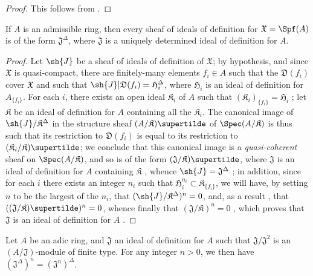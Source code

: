 \begin{proof}
This follows from .
\end{proof}

\begin{proposition}[10.3.5]
\label{I.10.3.5}
If $A$ is an admissible ring, then every sheaf of ideals of definition for $\mathfrak{X}=\Spf(A)$ is of the form $\mathfrak{J}^\Delta$, where $\mathfrak{J}$ is a uniquely determined ideal of definition for $A$.
\end{proposition}

\begin{proof}
Let $\sh{J}$ be a sheaf of ideals of definition of $\mathfrak{X}$; by hypothesis, and since $\mathfrak{X}$ is quasi-compact, there are finitely-many elements $f_i\in A$ such that the $\mathfrak{D}(f_i)$ cover $\mathfrak{X}$ and such that $\sh{J}|\mathfrak{D}(f_i)=\mathfrak{H}_i^\Delta$, where $\mathfrak{H}_i$ is an ideal of definition for $A_{\{f_i\}}$.
For each $i$, there exists an open ideal $\mathfrak{K}_i$ of $A$ such that $(\mathfrak{K}_i)_{\{f_i\}}=\mathfrak{H}_i$ ; let $\mathfrak{K}$ be an ideal of definition for $A$ containing all the $\mathfrak{K}_i$.
The canonical image of $\sh{J}/\mathfrak{K}^\Delta$ in the structure sheaf $(A/\mathfrak{K})\supertilde$ of $\Spec(A/\mathfrak{K})$  is thus such that its restriction to $\mathfrak{D}(f_i)$ is equal to its restriction to $(\mathfrak{K}_i/\mathfrak{K})\supertilde$;
we conclude that this canonical image is a \emph{quasi-coherent} sheaf on $\Spec(A/\mathfrak{K})$, and so is of the form $(\mathfrak{J}/\mathfrak{K})\supertilde$, where $\mathfrak{J}$ is an ideal of definition for $A$ containing $\mathfrak{K}$ , whence $\sh{J}=\mathfrak{J}^\Delta$ ;
in addition, since for each $i$ there exists an integer $n_i$ such that $\mathfrak{H}_i^{n_i}\subset\mathfrak{K}_{\{f_i\}}$, we will have, by setting $n$ to be the largest of the $n_i$, that $(\sh{J}/\mathfrak{K}^\Delta)^n=0$, and, as a result , that $((\mathfrak{J}/\mathfrak{K})\supertilde)^n=0$, whence finally that $(\mathfrak{J}/\mathfrak{K})^n=0$ , which proves that $\mathfrak{J}$ is an ideal of definition for $A$ .
\end{proof}

\begin{proposition}[10.3.6]
\label{I.10.3.6}
Let $A$ be an adic ring, and $\mathfrak{J}$ an ideal of definition for $A$ such that $\mathfrak{J}/\mathfrak{J}^2$ is an $(A/\mathfrak{J})$-module of finite type. For any integer $n>0$, we then have $(\mathfrak{J}^\Delta)^n=(\mathfrak{J}^n)^\Delta$.
\end{proposition}

